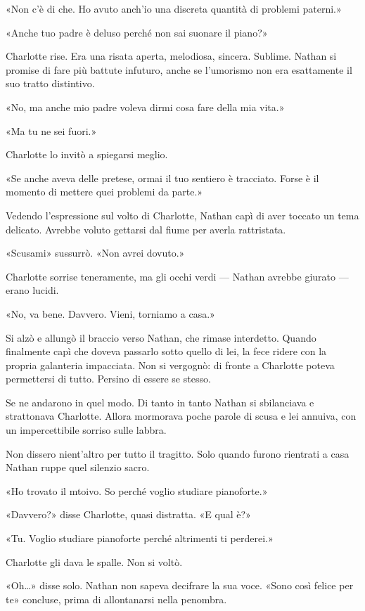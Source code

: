 \documentclass[a4paper,oneside,11pt]{memoir}
\begin{document}
«Non c'è di che. Ho avuto anch'io una discreta quantità di problemi paterni.»

«Anche tuo padre è deluso perché non sai suonare il piano?»

Charlotte rise. Era una risata aperta, melodiosa, sincera. Sublime. Nathan si promise di fare più battute infuturo,
anche se l'umorismo non era esattamente il suo tratto distintivo.

«No, ma anche mio padre voleva dirmi cosa fare della mia vita.»

«Ma tu ne sei fuori.»

Charlotte lo invitò a spiegarsi meglio.

«Se anche aveva delle pretese, ormai il tuo sentiero è tracciato. Forse è il momento di mettere quei problemi da parte.»

Vedendo l'espressione sul volto di Charlotte, Nathan capì di aver toccato un tema delicato. Avrebbe voluto gettarsi dal
fiume per averla rattristata.

«Scusami» sussurrò. «Non avrei dovuto.»

Charlotte sorrise teneramente, ma gli occhi verdi --- Nathan avrebbe giurato --- erano lucidi.

«No, va bene. Davvero. Vieni, torniamo a casa.»

Si alzò e allungò il braccio verso Nathan, che rimase interdetto. Quando finalmente capì che doveva passarlo sotto
quello di lei, la fece ridere con la propria galanteria impacciata. Non si vergognò: di fronte a Charlotte poteva
permettersi di tutto. Persino di essere se stesso.

Se ne andarono in quel modo. Di tanto in tanto Nathan si sbilanciava e strattonava Charlotte. Allora mormorava poche
parole di scusa e lei annuiva, con un impercettibile sorriso sulle labbra.

Non dissero nient'altro per tutto il tragitto. Solo quando furono rientrati a casa Nathan ruppe quel silenzio sacro.

«Ho trovato il mtoivo. So perché voglio studiare pianoforte.»

«Davvero?» disse Charlotte, quasi distratta. «E qual è?»

«Tu. Voglio studiare pianoforte perché altrimenti ti perderei.»

Charlotte gli dava le spalle. Non si voltò.

«Oh\dots{}» disse solo. Nathan non sapeva decifrare la sua voce. «Sono così felice per te» concluse, prima di
allontanarsi nella penombra.
\end{document}
